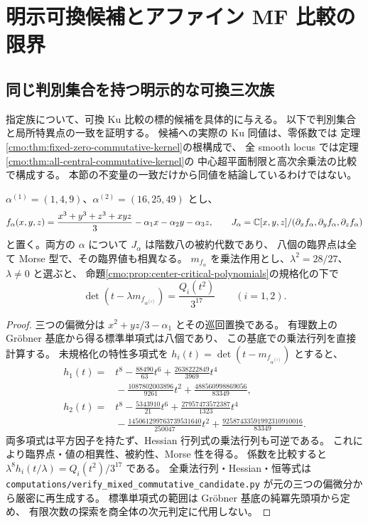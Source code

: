 \section{明示可換候補とアファイン MF 比較の限界}
\label{mix:sec:commutative-candidate}

\subsection{同じ判別集合を持つ明示的な可換三次族}

指定族について、可換 Ku 比較の標的候補を具体的に与える。
以下で判別集合と局所特異点の一致を証明する。
候補への実際の Ku 同値は、零係数では
定理\ref{cmo:thm:fixed-zero-commutative-kernel}の根構成で、
全 smooth locus では定理\ref{cmo:thm:all-central-commutative-kernel}の
中心超平面制限と高次余乗法の比較で構成する。
本節の不変量の一致だけから同値を結論しているわけではない。

\begin{proposition}
\label{cmo:prop:commutative-critical-spectrum}
$\alpha^{(1)}=(1,4,9)$、$\alpha^{(2)}=(16,25,49)$ とし、
\[
 f_\alpha(x,y,z)=\frac{x^3+y^3+z^3+xyz}{3}
                 -\alpha_1x-\alpha_2y-\alpha_3z,\qquad
 J_\alpha=\mathbb C[x,y,z]/(\partial_xf_\alpha,\partial_yf_\alpha,\partial_zf_\alpha)
\]
と置く。両方の $\alpha$ について $J_\alpha$ は階数八の被約代数であり、
八個の臨界点は全て Morse 型で、その臨界値も相異なる。
$m_{f_\alpha}$ を乗法作用とし、$\lambda^2=28/27$、$\lambda\ne0$ と選ぶと、
命題\ref{cmo:prop:center-critical-polynomials}の規格化の下で
\begin{equation}\label{cmo:eq:commutative-critical-spectrum}
 \det(t-\lambda m_{f_{\alpha^{(i)}}})
    =\frac{Q_i(t^2)}{3^{17}}\qquad(i=1,2).
\end{equation}
\end{proposition}
\begin{proof}
三つの偏微分は
$x^2+yz/3-\alpha_1$ とその巡回置換である。
有理数上の Gröbner 基底から得る標準単項式は八個であり、
この基底での乗法行列を直接計算する。
未規格化の特性多項式を $h_i(t)=\det(t-m_{f_{\alpha^{(i)}}})$ とすると、
\begin{align*}
 h_1(t)={}&t^8-\frac{88490}{63}t^6
 +\frac{2638222849}{3969}t^4\\
 &{}-\frac{1087802003896}{9261}t^2
 +\frac{488560998869056}{83349},\\
 h_2(t)={}&t^8-\frac{5343910}{21}t^6
 +\frac{27957473572387}{1323}t^4\\
 &{}-\frac{145061299763739531640}{250047}t^2
 +\frac{92587433591992310910016}{83349}.
\end{align*}
両多項式は平方因子を持たず、Hessian 行列式の乗法行列も可逆である。
これにより臨界点・値の相異性、被約性、Morse 性を得る。
係数を比較すると
$\lambda^8h_i(t/\lambda)=Q_i(t^2)/3^{17}$ である。
全乗法行列・Hessian・恒等式は
\texttt{computations/verify\_mixed\_commutative\_candidate.py}
が元の三つの偏微分から厳密に再生成する。
標準単項式の範囲は Gröbner 基底の純冪先頭項から定め、
有限次数の探索を商全体の次元判定に代用しない。
\end{proof}

